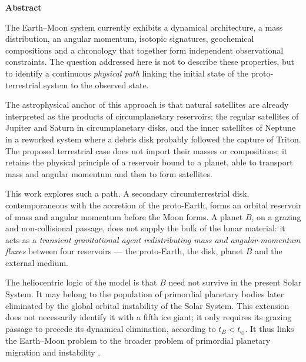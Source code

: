 \documentclass[11pt,a4paper,openany]{report}
\begin{document}
\thispagestyle{plain}
\begin{center}{\Large\bfseries Abstract}\end{center}
\medskip

The Earth--Moon system currently exhibits a dynamical architecture, a mass distribution, an
angular momentum, isotopic signatures, geochemical compositions and a chronology that together
form independent observational constraints. The question addressed here is not to describe these
properties, but to identify a continuous \emph{physical path} linking the initial state of the
proto-terrestrial system to the observed state.

The astrophysical anchor of this approach is that natural satellites are already interpreted as
the products of circumplanetary reservoirs: the regular satellites of Jupiter and Saturn in
circumplanetary disks, and the inner satellites of Neptune in a reworked system where a debris
disk probably followed the capture of Triton. The proposed terrestrial case does not import their
masses or compositions; it retains the physical principle of a reservoir bound to a planet, able
to transport mass and angular momentum and then to form satellites.

This work explores such a path. A secondary circumterrestrial disk, contemporaneous with the
accretion of the proto-Earth, forms an orbital reservoir of mass and angular momentum before the
Moon forms. A planet $B$, on a grazing and non-collisional passage, does not supply the bulk of
the lunar material: it acts as a \emph{transient gravitational agent redistributing
mass and angular-momentum fluxes} between four reservoirs --- the proto-Earth, the disk, planet
$B$ and the external medium.

The heliocentric logic of the model is that $B$ need not survive in the present Solar System. It may
belong to the population of primordial planetary bodies later eliminated by the global orbital
instability of the Solar System. This extension does not necessarily identify it with a fifth ice
giant; it only requires its grazing passage to precede its dynamical elimination, according to
$t_B<t_{\mathrm{ej}}$. It thus links the Earth--Moon problem to the broader problem of primordial
planetary migration and instability
\cite{Tsiganis2005,Gomes2005,Nesvorny2011,NesvornyMorbidelli2012,Liu2022,Clement2018}.
\end{document}

